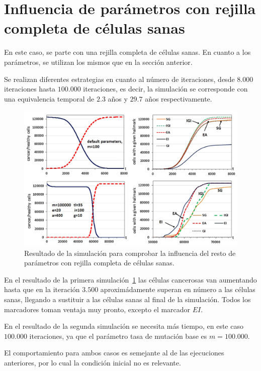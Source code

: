 \section{Influencia de parámetros con rejilla completa de células sanas}

En este caso, se parte con una rejilla completa de células sanas. En cuanto a los parámetros,
se utilizan los mismos que en la sección anterior.

Se realizan diferentes estrategias en cuanto al número de iteraciones, desde $8.000$ iteraciones
hasta $100.000$ iteraciones, es decir, la simulación se corresponde con una equivalencia temporal
de $2.3$ años y $29.7$ años respectivamente.

\begin{figure}[h]
\centering
\includegraphics[scale=0.5]{figures/experiments/exp5}
\caption{Resultado de la simulación para comprobar la influencia del resto de parámetros con rejilla completa de células sanas.}
\label{fig:exp5}
\end{figure}

En el resultado de la primera simulación~\ref{fig:exp5} las células cancerosas van aumentando
hasta que en la iteración $3.500$ aproximádamente superan en número a las células sanas,
llegando a sustituir a las células sanas al final de la simulación. Todos los marcadores
toman ventaja muy pronto, excepto el marcador $EI$.

En el resultado de la segunda simulación se necesita más tiempo, en este caso $100.000$ iteraciones,
ya que el parámetro tasa de mutación base es $m=100.000$.

El comportamiento para ambos casos es semejante al de las ejecuciones anteriores, por lo cual
la condición inicial no es relevante.

